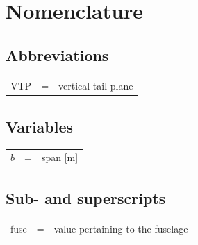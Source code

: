 
\chapter{Nomenclature}%
\label{nomenclature}

\section*{Abbreviations}
	\begin{longtable}{p{1.55cm} p{0.15cm} p{10cm}}
VTP 			&=& vertical tail plane \\
	\end{longtable}

\section*{Variables}
\begin{longtable}{p{1.55cm} p{0.15cm} p{10cm}}
$b$ 				&=& span [m]\\																				
\end{longtable}

	
\section*{Sub- and superscripts}
\begin{longtable}{p{1.55cm} p{0.15cm} p{9.8cm}}
fuse 				&=& value pertaining to the fuselage\\

\end{longtable}


